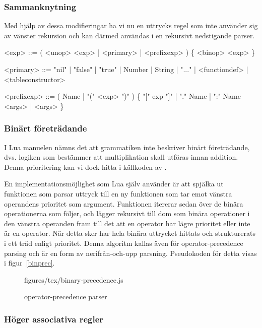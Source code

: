 \subsubsection{Sammanknytning}

Med hjälp av dessa modifieringar ha vi nu en uttrycks regel som inte använder
sig av vänster rekursion och kan därmed användas i en rekursivt nedstigande
parser.

\setlength{\grammarindent}{6em}
\begin{grammar}
  \singlespace\small%
  \selectfont
  <exp> ::= ( <unop> <exp> | <primary> | <prefixexp> ) \{ <binop> <exp> \}

  <primary> ::= "nil" | "false" | "true" | Number | String | "..." |
      <functiondef> | <tableconstructor>

  <prefixexp> ::= ( Name | "(" <exp> ")" ) \{ "[" exp "]" | "." Name |
      ":" Name <args> | <args> \}
\end{grammar}

\subsubsection{Binärt företrädande}

I Lua manuelen \citep{luaref} nämns det att grammatiken inte beskriver binärt företrädande,
dvs. logiken som bestämmer att multiplikation skall utföras innan addition.
Denna prioritering kan vi dock hitta i källkoden av \cite{lparse}.

En implementationsmöjlighet som Lua själv använder är att spjälka ut
funktionen som parsar uttryck till en ny funktionen som tar emot vänstra
operandens prioritet som argument. Funktionen itererar sedan över de binära
operationerna som följer, och lägger rekursivt till dom som binära operationer
i den vänstra operanden fram till det att en operator har lägre prioritet
eller inte är en operator. När detta sker har hela binära uttrycket hittats
och strukturerats i ett träd enligt prioritet. Denna algoritm kallas även för
operator-precedence parsing och är en form av nerifrån-och-upp parsning.
Pseudokoden för detta visas i figur~\ref{binprec}.

\begin{figure}[ht]
    {figures/tex/binary-precedence.js}
  \caption{operator-precedence parser}
  \label{fig:binprec}
\end{figure}


\subsubsection{Höger associativa regler}

